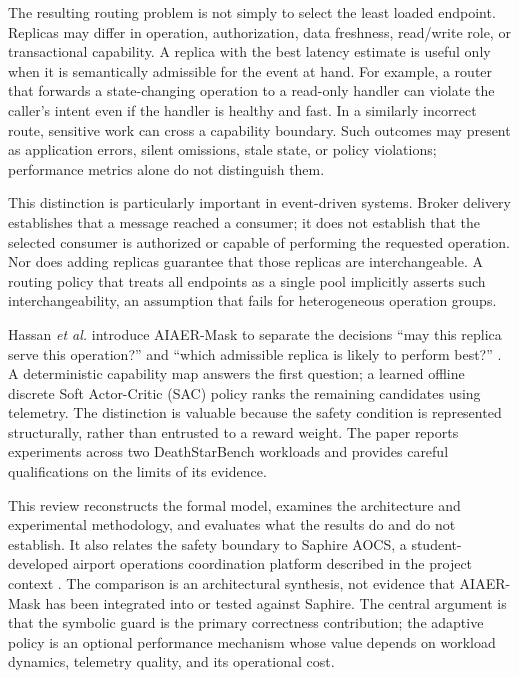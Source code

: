 \documentclass[conference]{IEEEtran}
\begin{document}
The resulting routing problem is not simply to select the least loaded endpoint. Replicas may differ in operation, authorization, data freshness, read/write role, or transactional capability. A replica with the best latency estimate is useful only when it is semantically admissible for the event at hand. For example, a router that forwards a state-changing operation to a read-only handler can violate the caller's intent even if the handler is healthy and fast. In a similarly incorrect route, sensitive work can cross a capability boundary. Such outcomes may present as application errors, silent omissions, stale state, or policy violations; performance metrics alone do not distinguish them.

This distinction is particularly important in event-driven systems. Broker delivery establishes that a message reached a consumer; it does not establish that the selected consumer is authorized or capable of performing the requested operation. Nor does adding replicas guarantee that those replicas are interchangeable. A routing policy that treats all endpoints as a single pool implicitly asserts such interchangeability, an assumption that fails for heterogeneous operation groups.

Hassan \emph{et al.} introduce AIAER-Mask to separate the decisions ``may this replica serve this operation?'' and ``which admissible replica is likely to perform best?'' \cite{hassan2026}. A deterministic capability map answers the first question; a learned offline discrete Soft Actor-Critic (SAC) policy ranks the remaining candidates using telemetry. The distinction is valuable because the safety condition is represented structurally, rather than entrusted to a reward weight. The paper reports experiments across two DeathStarBench workloads and provides careful qualifications on the limits of its evidence.

This review reconstructs the formal model, examines the architecture and experimental methodology, and evaluates what the results do and do not establish. It also relates the safety boundary to Saphire AOCS, a student-developed airport operations coordination platform described in the project context \cite{SaphireAOCS}. The comparison is an architectural synthesis, not evidence that AIAER-Mask has been integrated into or tested against Saphire. The central argument is that the symbolic guard is the primary correctness contribution; the adaptive policy is an optional performance mechanism whose value depends on workload dynamics, telemetry quality, and its operational cost.
\end{document}
